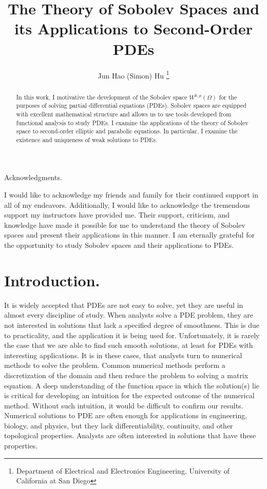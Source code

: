 \documentclass[10pt]{article}
\title{\Large{The Theory of Sobolev Spaces and its Applications to Second-Order PDEs}}
\author{Jun Hao (Simon) Hu \footnote{Department of Electrical and Electronics Engineering, University of California at San Diego}}
\begin{document}
\maketitle

\begin{abstract}
	In this work, I motivative the development of the Sobolev space $W^{k,p}(\Omega)$ for the purposes of solving partial differential equations (PDEs). Sobolev spaces are equipped with excellent mathematical structure and allows us to use tools developed from functional analysis to study PDEs. I examine the applications of the theory of Sobolev space to second-order elliptic and parabolic equations. In particular, I examine the existence and uniqueness of weak solutions to PDEs. 
\end{abstract}
\vspace{1in}
\begin{center}
	Acknowledgments.
\end{center}

\small{I would like to acknowledge my friends and family for their continued support in all of my endeavors. Additionally, I would like to acknowledge the tremendous support my instructors have provided me. Their support, criticism, and knowledge have made it possible for me to understand the theory of Sobolev spaces and present their applications in this manner. I am eternally grateful for the opportunity to study Sobolev spaces and their applications to PDEs.}

\newpage 

\tableofcontents

\newpage

\section{Introduction.}
It is widely accepted that PDEs are not easy to solve, yet they are useful in almost every discipline of study. When analysts solve a PDE problem, they are not interested in solutions that lack a specified degree of smoothness. This is due to practicality, and the application it is being used for. Unfortunately, it is rarely the case that we are able to find such smooth solutions, at least for PDEs with interesting applications. It is in these cases, that analysts turn to numerical methods to solve the problem. Common numerical methods perform a discretization of the domain and then reduce the problem to solving a matrix equation. A deep understanding of the function space in which the solution(s) lie is critical for developing an intuition for the expected outcome of the numerical method. Without such intuition, it would be difficult to confirm our results. Numerical solutions to PDE are often enough for applications in engineering, biology, and physics, but they lack differentiability, continuity, and other topological properties. Analysts are often interested in solutions that have these properties. 
\end{document}
